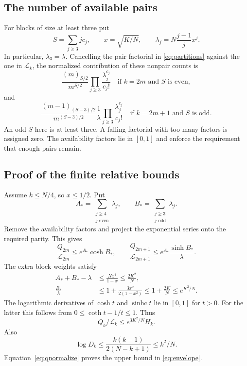 \documentclass[11pt]{article}
\theoremstyle{definition}
\theoremstyle{remark}
\newcommand{\1}{\mathbf 1}
\newcommand{\shc}{\operatorname{sinhc}}
\begin{document}
\subsection{The number of available pairs}

For blocks of size at least three put
\[
S=\sum_{j\ge3}jc_j,\qquad x=\sqrt{K/N},\qquad
\lambda_j=N\frac{j-1}{j}x^j.
\]
In particular, $\lambda_3=\lambda$. Cancelling the pair factorial in \eqref{eq:partitions} against the one in $\mathcal L_k$, the normalized contribution of these nonpair counts is
\begin{equation}\label{eq:availabilityeven}
\frac{(m)_{S/2}}{m^{S/2}}
\prod_{j\ge3}\frac{\lambda_j^{c_j}}{c_j!}
\quad\text{if }k=2m\text{ and }S\text{ is even},
\end{equation}
and
\begin{equation}\label{eq:availabilityodd}
\frac{(m-1)_{(S-3)/2}}{m^{(S-3)/2}}
\frac1\lambda\prod_{j\ge3}\frac{\lambda_j^{c_j}}{c_j!}
\quad\text{if }k=2m+1\text{ and }S\text{ is odd}.
\end{equation}
An odd $S$ here is at least three. A falling factorial with too many factors is assigned zero. The availability factors lie in $[0,1]$ and enforce the requirement that enough pairs remain.

\subsection{Proof of the finite relative bounds}

Assume $k\le N/4$, so $x\le1/2$. Put
\[
A_* =\sum_{\substack{j\ge4\\j\text{ even}}}\lambda_j,
\qquad B_* =\sum_{\substack{j\ge3\\j\text{ odd}}}\lambda_j.
\]
Remove the availability factors and project the exponential series onto the required parity. This gives
\[
\frac{Q_{2m}}{\mathcal L_{2m}}\le e^{A_*}\cosh B_*,\qquad
\frac{Q_{2m+1}}{\mathcal L_{2m+1}}\le e^{A_*}\frac{\sinh B_*}{\lambda}.
\]
The extra block weights satisfy
\begin{align*}
A_*+B_*-\lambda&\le\frac{Nx^4}{1-x}\le\frac{2K^2}N,\\
\frac{B_*}{\lambda}&\le1+\frac{3x^2}{2(1-x^2)}
\le1+\frac{2K}N\le e^{K^2/N}.
\end{align*}
The logarithmic derivatives of $\cosh t$ and $\shc t$ lie in $[0,1]$ for $t>0$. For the latter this follows from $0\le\coth t-1/t\le1$. Thus
\[
Q_k/\mathcal L_k\le e^{3K^2/N}H_k.
\]
Also
\[
\log D_k\le\frac{k(k-1)}{2(N-k+1)}\le k^2/N.
\]
Equation~\eqref{eq:qnormalize} proves the upper bound in \eqref{eq:envelope}.
\end{document}
